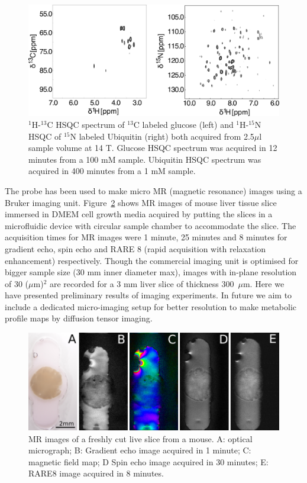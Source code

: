 \documentclass[preprint,12pt]{article}
\begin{document}
\begin{figure}
\centering
\includegraphics[width=.7\linewidth,keepaspectratio=true]{./figures/ms5n17-tlp-sp-180612-HSQCspect.png} 
\caption{$^1$H-$^{13}$C HSQC spectrum of $^{13}$C labeled glucose (left) and $^1$H-$^{15}$N HSQC of $^{15}$N labeled Ubiquitin (right) both acquired from 2.5$\mu$l sample volume at 14 T. Glucose HSQC spectrum was acquired in 12 minutes from a 100 mM sample. Ubiquitin HSQC spectrum was acquired in 400 minutes from a 1 mM sample.}
\label{fig:HSQC} 
\end{figure}
The probe has been used to make micro MR (magnetic resonance) images using a Bruker imaging unit. Figure~\ref{fig:tisli} shows MR images of mouse liver tissue slice immersed in DMEM cell growth media acquired by putting the slices in a microfluidic device with circular sample chamber to accommodate the slice. The acquisition times for MR images were 1 minute, 25 minutes and 8 minutes for gradient echo, spin echo and RARE 8 (rapid acquisition with relaxation enhancement) respectively. Though the commercial imaging unit is optimised for bigger sample size (30 mm inner diameter max), images with in-plane resolution of 30 ($\mu$m)$^{2}$ are recorded for a 3 mm liver slice of thickness 300~$\mu$m. Here we have presented preliminary results of imaging experiments. In future we aim to include a dedicated micro-imaging setup for better resolution to make metabolic profile maps by diffusion tensor imaging.\par
\begin{figure}
\centering
\includegraphics[width=.7\linewidth,keepaspectratio=true]{./figures/ms5n17-tisli-im-180511.png} 
\caption{MR images of a freshly cut live slice from a mouse. A: optical micrograph; B: Gradient echo image acquired in 1 minute; C: magnetic field map; D Spin echo image acquired in 30 minutes; E: RARE8 image acquired in 8 minutes.}
\label{fig:tisli} 
\end{figure}
\end{document}
